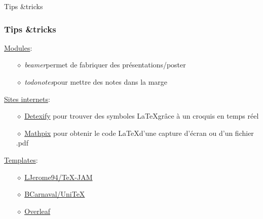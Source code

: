 

\begin{frame}
    \vfill
    \begin{center}
        \large
        Tips \&\;tricks
    \end{center}
    \vfill
\end{frame}

\begin{frame}
    \frametitle{ Tips \&\;tricks}
    \underline{Modules}:
    \begin{itemize}
        \item[$\diamond$] \textcolor{vibrant_green}{\textit{beamer}}\footnotemark permet de fabriquer des présentations/poster
        \item[$\diamond$] \textcolor{vibrant_green}{\textit{todonotes}}\footnotemark pour mettre des notes dans la marge
    \end{itemize}
    \vfill
    \pause
    \underline{Sites internets}:
    \begin{itemize}
        \item[$\diamond$] \href{https://detexify.kirelabs.org/classify.html}{\textcolor{lila_links}{Detexify}} pour trouver des symboles \LaTeX\;grâce à un croquis en temps réel
        \item[$\diamond$] \href{https://mathpix.com/}{\textcolor{lila_links}{Mathpix}} pour obtenir le code \LaTeX\;d'une capture d'écran ou d'un fichier .pdf
    \end{itemize}
    \vfill
    \pause
    \underline{Templates}:
    \begin{itemize}
        \item[$\diamond$] \href{https://github.com/LJerome94/TeX-JAM/tree/main}{\textcolor{lila_links}{LJerome94/TeX-JAM}}
        \item[$\diamond$] \href{https://github.com/BCarnaval/UniTeX}{\textcolor{lila_links}{BCarnaval/UniTeX}}
        \item[$\diamond$] \href{https://www.overleaf.com/latex/templates}{\textcolor{lila_links}{Overleaf}}
    \end{itemize}
\end{frame}
